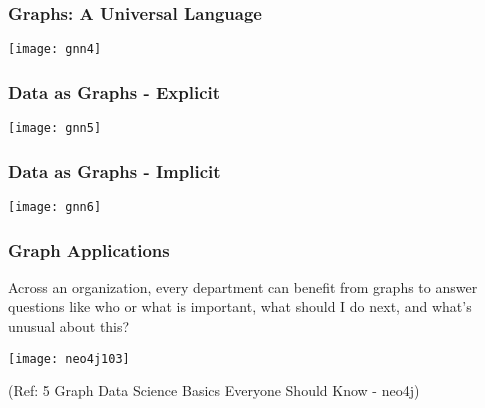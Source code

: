 \begin{frame}[fragile]\frametitle{Graphs: A Universal Language }

\begin{center}
\texttt{[image: gnn4]}
\end{center}	  

\end{frame}


\begin{frame}[fragile]\frametitle{Data as Graphs - Explicit }

\begin{center}
\texttt{[image: gnn5]}
\end{center}	  

\end{frame}

\begin{frame}[fragile]\frametitle{Data as Graphs - Implicit }

\begin{center}
\texttt{[image: gnn6]}
\end{center}	  

\end{frame}


\begin{frame}\frametitle{ Graph Applications }

Across an organization, every department can benefit from graphs to answer questions 
like who or what is important, what should I do next, and what’s unusual about this?

\begin{center}
\texttt{[image: neo4j103]}
\end{center}	  


{\tiny (Ref: 5 Graph Data Science Basics Everyone Should Know - neo4j)}
\end{frame}



